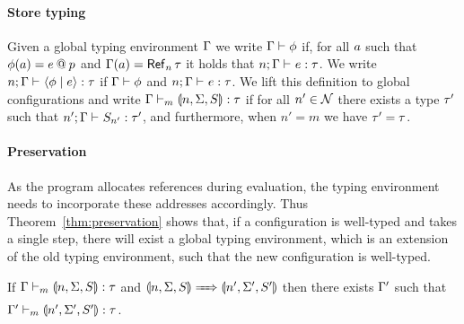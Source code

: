 \paragraph{Store typing}
Given a global typing environment $\Gamma$ we write $\Gamma \vdash \phi$ if, for all $a$ such that $\phi(a) = e \mathbin{@} p$ and $\tenv(\addr) = \reftype[n]{\type}$ it holds that $\hastype{n; \tenv}{\expr}{\type}$. We write $\hastype{n; \tenv}{\config{\store}{\expr}}{\type}$ if $\Gamma \vdash \phi$ and $\hastype{n; \tenv}{\expr}{\type}$. We lift this definition to global configurations and write $\hastype[m]{\tenv}{\gconfig{n}{\env}{S}}{\type}$ if for all $n' \in \mathcal{N}$ there exists a type $\tau'$ such that $\hastype{n'; \tenv}{S_{n'}}{\type'}$, and furthermore, when $n' = m$ we have $\tau' = \tau$.

\paragraph{Preservation}
As the program allocates references during evaluation, the typing environment needs to incorporate these addresses accordingly. Thus Theorem~\ref{thm:preservation} shows that, if a configuration is well-typed and takes a single step, there will exist a global typing environment, which is an extension of the old typing environment, such that the new configuration is well-typed.

\begin{theorem}[Preservation]\label{thm:preservation}
If $\hastype[m]{\tenv}{\gconfig{n}{\env}{S}}{\type}$ and $\gconfig{n}{\env}{S} \gstepsto \gconfig{n'}{\env'}{S'}$ then there exists $\Gamma'$ such that $\hastype[m]{\tenv'}{\gconfig{n'}{\env'}{S'}}{\type}$.
\end{theorem}


